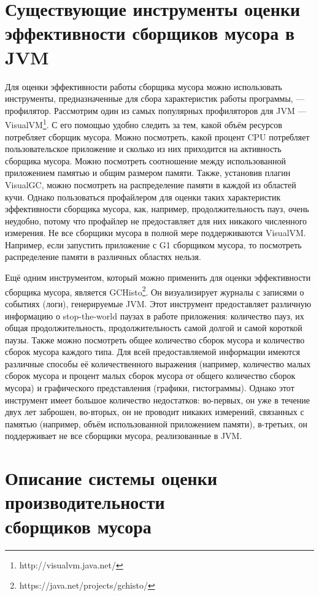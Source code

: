 \section{Существующие инструменты оценки\\эффективности сборщиков мусора в JVM}
Для оценки эффективности работы сборщика мусора можно использовать инструменты, 
предназначенные для сбора характеристик работы программы, --- профилятор. Рассмотрим 
один из самых популярных профиляторов для JVM --- VisualVM\footnote{http://visualvm.java.net/}.
С его помощью удобно
следить за тем, какой объём ресурсов потребляет сборщик мусора. Можно посмотреть,
какой процент CPU потребляет пользовательское приложение и сколько из них приходится
на активность сборщика мусора. Можно посмотреть соотношение между использованной
приложением памятью и общим размером памяти. Также, установив плагин VisualGC, можно
посмотреть на распределение памяти в каждой из областей кучи. Однако пользоваться 
профайлером для оценки таких характеристик эффективности сборщика мусора, как, например,
продолжительность пауз, очень неудобно, потому что профайлер не предоставляет для них 
никакого численного измерения. Не все сборщики мусора в полной мере поддерживаются 
VisualVM. Например, если запустить приложение с G1 сборщиком мусора, то посмотреть распределение
памяти в различных областях нельзя.

Ещё одним инструментом, который можно применить для оценки эффективности сборщика мусора,
является GCHisto\footnote{https://java.net/projects/gchisto/}. Он визуализирует журналы
с записями о событиях (логи), генерируемые JVM. Этот инструмент предоставляет различную 
информацию о stop-the-world паузах в работе приложения: количество пауз, их общая продолжительность,
продолжительность самой долгой и самой короткой паузы. Также можно посмотреть общее количество
сборок мусора и количество сборок мусора каждого типа. Для всей предоставляемой информации
имеются различные способы её количественного выражения (например, количество малых сборок мусора
и процент малых сборок мусора от общего количество сборок мусора) и графического представления
(графики, гистограммы). Однако этот инструмент имеет большое количество недостатков:
во-первых, он уже в течение двух лет заброшен, во-вторых, он не проводит никаких
измерений, связанных с памятью (например, объём использованной приложением памяти), в-третьих,
он поддерживает не все сборщики мусора, реализованные в JVM.

\section{Описание системы оценки производительности\\сборщиков мусора}

